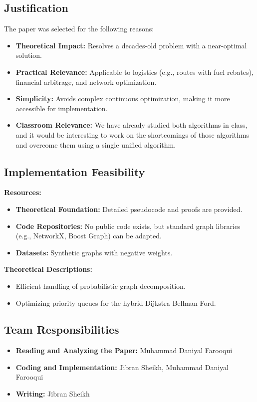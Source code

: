 \documentclass{article}
\begin{document}
\subsection{Justification}

The paper was selected for the following reasons:

\begin{itemize}
    \item \textbf{Theoretical Impact:} Resolves a decades-old problem with a near-optimal solution.
    \item \textbf{Practical Relevance:} Applicable to logistics (e.g., routes with fuel rebates), financial arbitrage, and network optimization.
    \item \textbf{Simplicity:} Avoids complex continuous optimization, making it more accessible for implementation.
    \item \textbf{Classroom Relevance:} We have already studied both algorithms in class, and it would be interesting to work on the shortcomings of those algorithms and overcome them using a single unified algorithm.
\end{itemize}

\subsection{Implementation Feasibility}

\textbf{Resources:}
\begin{itemize}
    \item \textbf{Theoretical Foundation:} Detailed pseudocode and proofs are provided.
    \item \textbf{Code Repositories:} No public code exists, but standard graph libraries (e.g., NetworkX, Boost Graph) can be adapted.
    \item \textbf{Datasets:} Synthetic graphs with negative weights.
\end{itemize}

\textbf{Theoretical Descriptions:}
\begin{itemize}
    \item Efficient handling of probabilistic graph decomposition.
    \item Optimizing priority queues for the hybrid Dijkstra-Bellman-Ford.
\end{itemize}

\subsection{Team Responsibilities}
\begin{itemize}
    \item \textbf{Reading and Analyzing the Paper:} Muhammad Daniyal Farooqui
    \item \textbf{Coding and Implementation:} Jibran Sheikh, Muhammad Daniyal Farooqui
    \item \textbf{Writing:} Jibran Sheikh
\end{itemize}
\end{document}
